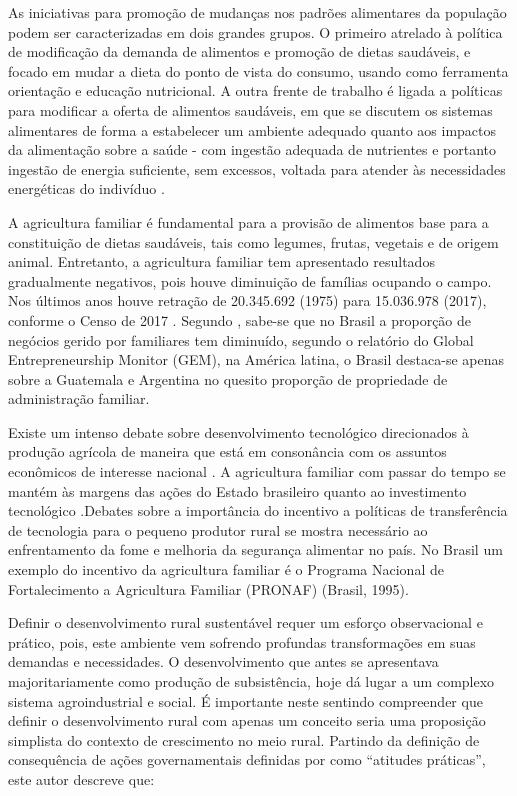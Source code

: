 As iniciativas para promoção de mudanças nos padrões alimentares da população podem ser caracterizadas em dois grandes grupos. O primeiro atrelado à política de modificação da demanda de alimentos e promoção de dietas saudáveis, e focado em mudar a dieta do ponto de vista do consumo, usando como ferramenta orientação e educação nutricional. A outra frente de trabalho é ligada a políticas para modificar a oferta de alimentos saudáveis, em que se discutem os sistemas alimentares de forma a estabelecer um ambiente adequado quanto aos impactos da alimentação sobre a saúde - com ingestão adequada de nutrientes e portanto ingestão de energia suficiente, sem excessos, voltada para atender às necessidades energéticas do indivíduo \cite{maia_padroes_2018}.

A agricultura familiar é fundamental para a provisão de alimentos base para a constituição de dietas saudáveis, tais como legumes, frutas, vegetais e de origem animal. Entretanto, a agricultura familiar tem apresentado resultados gradualmente negativos, pois houve diminuição de famílias ocupando o campo. Nos últimos anos houve retração de 20.345.692 (1975) para 15.036.978 (2017), conforme o Censo de 2017 \cite{ibge_censo_2018}. Segundo , sabe-se que no Brasil a proporção de negócios gerido por familiares tem diminuído, segundo o relatório do Global Entrepreneurship Monitor (GEM), na América latina, o Brasil destaca-se apenas sobre a Guatemala e Argentina no quesito proporção de propriedade de administração familiar. 

Existe um intenso debate sobre desenvolvimento tecnológico direcionados à produção agrícola de maneira que está  em consonância com os assuntos econômicos de interesse nacional \cite{lopes_visao_2014}. A agricultura familiar com passar do tempo se mantém às margens das ações do Estado brasileiro quanto ao investimento tecnológico  \cite{beatriz_propriedade_2015}.Debates sobre a importância do incentivo a políticas de transferência de tecnologia para o pequeno produtor rural se mostra necessário ao enfrentamento da fome e melhoria da segurança alimentar no país. No Brasil um exemplo do incentivo da agricultura familiar é o Programa Nacional de Fortalecimento a Agricultura Familiar (PRONAF) (Brasil, 1995).


Definir o desenvolvimento rural sustentável requer um esforço observacional e prático, pois, este ambiente vem sofrendo profundas transformações em suas demandas e necessidades. O desenvolvimento que antes se apresentava majoritariamente como produção de subsistência, hoje dá lugar a um complexo sistema agroindustrial \cite{bastos_determinantes_2018} e social. É importante neste sentindo compreender que definir o desenvolvimento rural com apenas um conceito seria uma proposição simplista do contexto de crescimento no meio rural. Partindo da definição de consequência de ações governamentais definidas por  como “atitudes práticas”, este autor descreve que:


